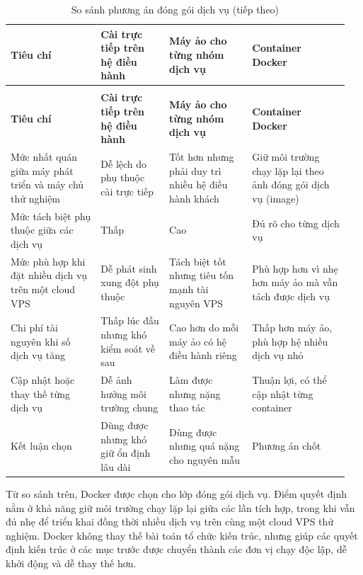 \documentclass[a4paper]{extarticle}
\newcommand{\thesissettableid}[2]{%
  \renewcommand{\thetable}{#1}%
  \renewcommand{\theHtable}{#2}%
}
\begin{document}
{\thesissettableid{3.39}{condensed-bang-3-39-so-sanh-phuong-an-dong-goi-dich-vu}
\def\LTcaptype{table}
\begin{longtable}{|L{0.251\linewidth}|L{0.191\linewidth}|L{0.232\linewidth}|L{0.277\linewidth}|}
\caption{So sánh phương án đóng gói dịch vụ}\label{tab:condensed-bang-3-39-so-sanh-phuong-an-dong-goi-dich-vu}\\
\hline
\textbf{Tiêu chí} & \textbf{Cài trực tiếp trên hệ điều hành} & \textbf{Máy ảo cho từng nhóm dịch vụ} & \textbf{Container Docker} \\
\hline
\endfirsthead
\caption[]{So sánh phương án đóng gói dịch vụ (tiếp theo)}\\
\hline
\textbf{Tiêu chí} & \textbf{Cài trực tiếp trên hệ điều hành} & \textbf{Máy ảo cho từng nhóm dịch vụ} & \textbf{Container Docker} \\
\hline
\endhead
\endfoot
\endlastfoot
Mức nhất quán giữa máy phát triển và máy chủ thử nghiệm & Dễ lệch do phụ thuộc cài trực tiếp & Tốt hơn nhưng phải duy trì nhiều hệ điều hành khách & Giữ môi trường chạy lặp lại theo ảnh đóng gói dịch vụ (image) \\\hline
Mức tách biệt phụ thuộc giữa các dịch vụ & Thấp & Cao & Đủ rõ cho từng dịch vụ \\\hline
Mức phù hợp khi đặt nhiều dịch vụ trên một cloud VPS & Dễ phát sinh xung đột phụ thuộc & Tách biệt tốt nhưng tiêu tốn mạnh tài nguyên VPS & Phù hợp hơn vì nhẹ hơn máy ảo mà vẫn tách được dịch vụ \\\hline
Chi phí tài nguyên khi số dịch vụ tăng & Thấp lúc đầu nhưng khó kiểm soát về sau & Cao hơn do mỗi máy ảo có hệ điều hành riêng & Thấp hơn máy ảo, phù hợp hệ nhiều dịch vụ nhỏ \\\hline
Cập nhật hoặc thay thế từng dịch vụ & Dễ ảnh hưởng môi trường chung & Làm được nhưng nặng thao tác & Thuận lợi, có thể cập nhật từng container \\\hline
Kết luận chọn & Dùng được nhưng khó giữ ổn định lâu dài & Dùng được nhưng quá nặng cho nguyên mẫu & Phương án chốt \\\hline
\end{longtable}
}

Từ so sánh trên, Docker được chọn cho lớp đóng gói dịch vụ. Điểm quyết định nằm
ở khả năng giữ môi trường chạy lặp lại giữa các lần tích hợp, trong khi vẫn đủ
nhẹ để triển khai đồng thời nhiều dịch vụ trên cùng một cloud VPS thử nghiệm.
Docker không thay thế bài toán tổ chức kiến trúc, nhưng giúp các quyết định kiến
trúc ở các mục trước được chuyển thành các đơn vị chạy độc lập, dễ khởi động và
dễ thay thế hơn.
\end{document}
